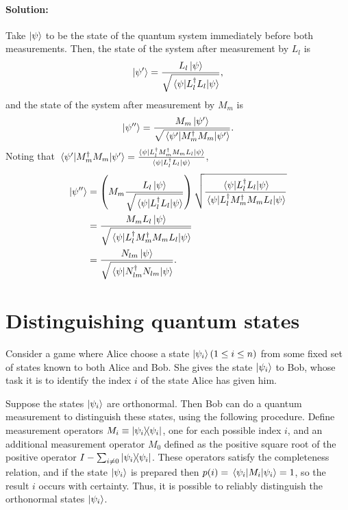 \paragraph{Solution:} Take $\ket{\psi}$ to be the state of the quantum system
immediately before both measurements. Then, the state of the system after
measurement by $L_l$ is \begin{equation*}
  \ket{\psi'} = \frac{L_l\ket{\psi}}{\sqrt{\mel{\psi}{L_l^\dagger L_l}{\psi}}},
\end{equation*} and the state of the system after measurement by $M_m$ is
\begin{equation*}
  \ket{\psi''} = \frac{M_m\ket{\psi'}}{\sqrt{\mel{\psi'}{M_m^\dagger M_m}
    {\psi'}}}.
\end{equation*}
Noting that $\mel{\psi'}{M_m^\dagger M_m}{\psi'} = \frac{\mel{\psi}{L_l^\dagger
M_m^\dagger M_m L_l}{\psi}}{\mel{\psi}{L_l^\dagger L_l}{\psi}}$,
\begin{align*}
  \ket{\psi''} &= \left(M_m\frac{L_l\ket{\psi}}{\sqrt{\mel{\psi}{L_l^\dagger
    L_l}{\psi}}}\right)\sqrt{\frac{\mel{\psi}{L_l^\dagger L_l}{\psi}}
    {\mel{\psi}{L_l^\dagger M_m^\dagger M_m L_l}{\psi}}} \\
  &= \frac{M_mL_l\ket{\psi}}{\sqrt{\mel{\psi}{L_l^\dagger M_m^\dagger M_m L_l}
    {\psi}}} \\
  &= \frac{N_{lm}\ket{\psi}}{\sqrt{\mel{\psi}{N_{lm}^\dagger N_{lm}}{\psi}}}.
\end{align*}

\section{Distinguishing quantum states}

Consider a game where Alice choose a state $\ket{\psi_i} (1 \leq i \leq n)$
from some fixed set of states known to both Alice and Bob. She gives the state
$\ket{\psi_i}$ to Bob, whose task it is to identify the index $i$ of the state
Alice has given him.

Suppose the states $\ket{\psi_i}$ are orthonormal. Then Bob can do a quantum
measurement to distinguish these states, using the following procedure. Define
measurement operators $M_i \equiv \ketbra{\psi_i}{\psi_i}$, one for each
possible index $i$, and an additional measurement operator $M_0$ defined as the
positive square root of the positive operator $I - \sum_{i \neq 0}
\ketbra{\psi_i}{\psi_i}$. These operators satisfy the completeness relation,
and if the state $\ket{\psi_i}$ is prepared then $p(i) = \mel{\psi_i}{M_i}
{\psi_i} = 1$, so the result $i$ occurs with certainty. Thus, it is possible
to reliably distinguish the orthonormal states $\ket{\psi_i}$.


